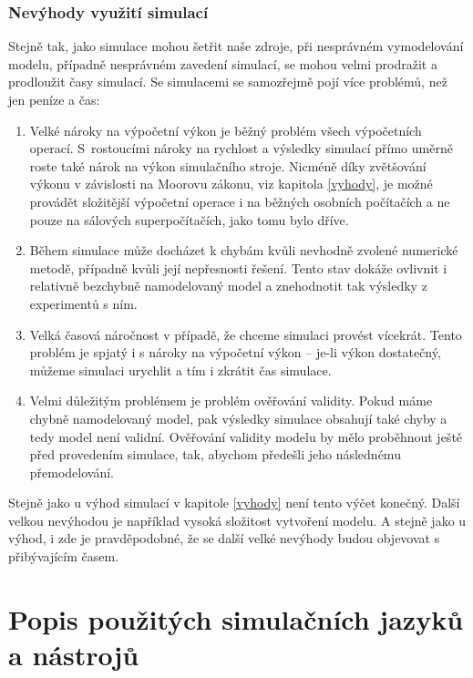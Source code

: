 \subsection{Nevýhody využití simulací}

Stejně tak, jako simulace mohou šetřit naše zdroje, při nesprávném vymodelování modelu, případně nesprávném zavedení simulací, se mohou velmi prodražit a prodloužit časy simulací. Se simulacemi se samozřejmě pojí více problémů, než jen peníze a čas:

\begin{enumerate}
    \item Velké nároky na výpočetní výkon je běžný problém všech výpočetních operací. S~rostoucími nároky na rychlost a výsledky simulací přímo uměrně roste také nárok na výkon simulačního stroje. Nicméně díky zvětšování výkonu v závislosti na Moorovu zákonu, viz kapitola \ref{vyhody}, je možné provádět složitější výpočetní operace i na běžných osobních počítačích a ne pouze na sálových superpočítačích, jako tomu bylo dříve.
    \item Během simulace může docházet k chybám kvůli nevhodně zvolené numerické metodě, případně kvůli její nepřesnosti řešení. Tento stav dokáže ovlivnit i relativně bezchybně namodelovaný model a znehodnotit tak výsledky z experimentů s ním. 
    \item Velká časová náročnost v případě, že chceme simulaci provést vícekrát. Tento problém je spjatý i s nároky na výpočetní výkon -- je-li výkon dostatečný, můžeme simulaci urychlit a tím i zkrátit čas simulace.
    \item Velmi důležitým problémem je problém ověřování validity. Pokud máme chybně namodelovaný model, pak výsledky simulace obsahují také chyby a tedy model není validní. Ověřování validity modelu by mělo proběhnout ještě před provedením simulace, tak, abychom předešli jeho následnému přemodelování.
\end{enumerate}

Stejně jako u výhod simulací v kapitole \ref{vyhody} není tento výčet konečný. Další velkou nevýhodou je například vysoká složitost vytvoření modelu. A stejně jako u výhod, i zde je pravděpodobné, že se další velké nevýhody budou objevovat s přibývajícím časem. 

\chapter{Popis použitých simulačních jazyků a nástrojů}
\label{kapitola3}

